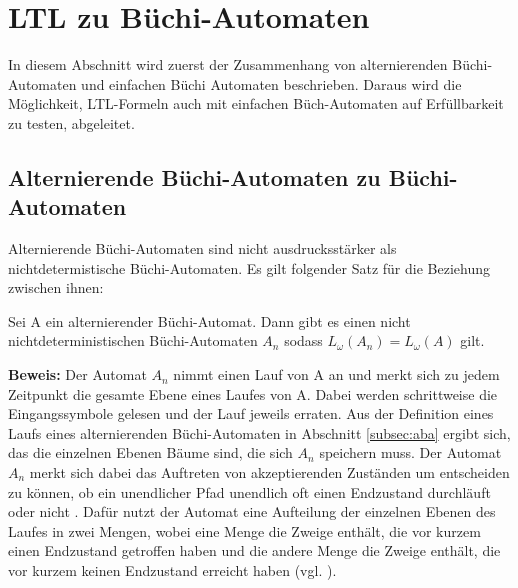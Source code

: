 \section{LTL zu Büchi-Automaten}

In diesem Abschnitt wird zuerst der Zusammenhang von alternierenden Büchi-Automaten und einfachen Büchi Automaten beschrieben. Daraus wird die Möglichkeit, LTL-Formeln auch mit einfachen Büch-Automaten auf Erfüllbarkeit zu testen, abgeleitet.

\subsection{Alternierende Büchi-Automaten zu Büchi-Automaten}

Alternierende Büchi-Automaten sind nicht ausdrucksstärker als nichtdetermistische Büchi-Automaten. Es gilt folgender Satz für die Beziehung zwischen ihnen:
\begin{satz}\cite{vardi+96,miyano+84}
\label{ABA>BA}
Sei A ein alternierender Büchi-Automat. Dann gibt es einen nicht nichtdeterministischen Büchi-Automaten $A_n$ sodass $L_{\omega}(A_n)=L_{\omega}(A)$ gilt.
\end{satz}
\textbf{Beweis:} Der Automat $A_n$ nimmt einen Lauf von A an und merkt sich zu jedem Zeitpunkt die gesamte Ebene eines Laufes von A. Dabei werden schrittweise die Eingangssymbole gelesen und der Lauf jeweils erraten. Aus der Definition eines Laufs eines alternierenden Büchi-Automaten in Abschnitt \ref{subsec:aba} ergibt sich, das die einzelnen Ebenen Bäume sind, die sich $A_n$ speichern muss. Der Automat $A_n$ merkt sich dabei das Auftreten von akzeptierenden Zuständen um entscheiden zu können, ob ein unendlicher Pfad unendlich oft einen Endzustand durchläuft oder nicht \cite{vardi+96}. Dafür nutzt der Automat eine Aufteilung der einzelnen Ebenen des Laufes in zwei Mengen, wobei eine Menge die Zweige enthält, die vor kurzem einen Endzustand getroffen haben und die andere Menge die Zweige enthält, die vor kurzem keinen Endzustand erreicht haben (vgl. \cite{vardi+96}).

